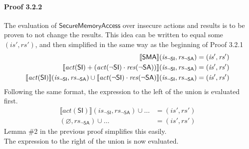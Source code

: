 \documentclass[12pt, letterpaper]{article}
\let\emptyset\varnothing
\begin{document}
\paragraph{Proof 3.2.2}
    The evaluation of $\mathsf{SecureMemoryAccess}$ over insecure actions and results is to be proven to not change the results.  This idea can be written to equal some $(\mathit{is}', \mathit{rs}')$, and then simplified in the same way as the beginning of Proof 3.2.1
\begin{align}
    \setcounter{equation}{0}
    \llbracket \mathsf{SMA} \rrbracket (\mathit{is_{\mathsf{\neg SI}}}, \mathit{rs_{\mathsf{\neg SA}}})
    &=
    (\mathit{is}', \mathit{rs}')
    \\
    \llbracket \mathit{act}(\mathsf{SI}) +
    (\mathit{act}(\neg\mathsf{SI}) \cdot
     \mathit{res}(\neg\mathsf{SA}))  \rrbracket (\mathit{is_{\mathsf{\neg SI}}}, \mathit{rs_{\mathsf{\neg SA}}})
    &=
    (\mathit{is}', \mathit{rs}')
    \\
    \llbracket \mathit{act}(\mathsf{SI}) \rrbracket (\mathit{is_{\mathsf{\neg SI}}}, \mathit{rs_{\mathsf{\neg SA}}}) \cup %
    \llbracket \mathit{act}(\neg\mathsf{SI}) \cdot
     \mathit{res}(\neg\mathsf{SA}) \rrbracket (\mathit{is_{\mathsf{\neg SI}}}, \mathit{rs_{\mathsf{\neg SA}}})
    &=
    (\mathit{is}', \mathit{rs}')
\end{align}
    Following the same format, the expression to the left of the union is evaluated first.
\begin{align}
    \llbracket \mathit{act}(\mathsf{SI}) \rrbracket (\mathit{is_{\mathsf{\neg SI}}}, \mathit{rs_{\mathsf{\neg SA}}}) \cup \ldots
    &=
    (\mathit{is}', \mathit{rs}')
    \\
    (\emptyset, \mathit{rs_{\mathsf{\neg SA}}}) \cup \ldots
    &=
    (\mathit{is}', \mathit{rs}')
\end{align}
    Lemma \#2 in the previous proof simplifies this easily.\\
    The expression to the right of the union is now evaluated.
\end{document}

